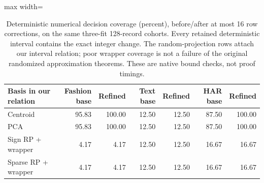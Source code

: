 \begin{table}[tbp]
\centering
\small
\caption{Deterministic numerical decision coverage (percent), before/after at most 16 row corrections, on the same three-fit 128-record cohorts. Every retained deterministic interval contains the exact integer change. The random-projection rows attach our interval relation; poor wrapper coverage is not a failure of the original randomized approximation theorems. These are native bound checks, not proof timings.}
\label{tab:latest-coverage}
\begin{adjustbox}{max width=\textwidth}
\begin{tabular*}{.98\textwidth}{@{\extracolsep{\fill}}lrrrrrr@{}}
\toprule
Basis in our relation & Fashion base & Refined & Text base & Refined & HAR base & Refined\\
\midrule
Centroid & 95.83 & 100.00 & 12.50 & 12.50 & 87.50 & 100.00\\
PCA & 95.83 & 100.00 & 12.50 & 12.50 & 87.50 & 100.00\\
Sign RP + wrapper & 4.17 & 4.17 & 12.50 & 12.50 & 16.67 & 16.67\\
Sparse RP + wrapper & 4.17 & 4.17 & 12.50 & 12.50 & 16.67 & 16.67\\
\bottomrule
\end{tabular*}
\end{adjustbox}
\end{table}
